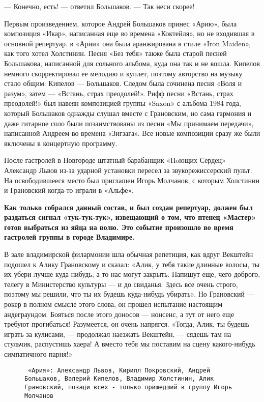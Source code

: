 — Конечно, есть! — ответил Большаков.
— Так неси скорее!

Первым произведением, которое Андрей Большаков принес «Арию», была композиция «Икар», написанная еще во времена
«Коктейля», но не входившая в основной репертуар. в «Арии» она была аранжирована в стиле «Iron Maiden», как того хотел
Холстинин. Песня «Без тебя» также была старой песней Большакова, написанной для сольного альбома, куда она так и не
вошла. Кипелов немного скорректировал ее мелодию и куплет, поэтому авторство на музыку стало общим: Кипелов — Большаков.
Следом была сочинена песня «Воля и разум», затем — «Встань, страх преодолей!». Рифф песни «Встань, страх преодолей!» был
навеян композицией группы «Saxon» с альбома 1984 года, который Большаков однажды слушал вместе с Грановским, но сама
гармония и даже гитарное соло были позаимствованы из песни «Мы принимаем передачи», написанной Андреем во времена
«Зигзага». Все новые композиции сразу же были включены в концертную программу.

После гастролей в Новгороде штатный барабанщик «Пoющих Сердец» Александр Львов из-за ударной установки пересел за
звукорежиссерский пульт. На освободившееся место был приглашен Игорь Молчанов, с которым Холстинин и Грановский когда-то
играли в «Альфе».

\textbf{Как только собрался данный состав, и был создан репертуар, должен был раздаться сигнал «тук-тук-тук», извещающий
о том, что птенец «Мастер» готов выбраться из яйца на волю. Это событие произошло во время гастролей группы в городе
Владимире.}

В зале владимирской филармонии шла обычная репетиция, как вдруг Векштейн подошел к Алику Грановскому и сказал: «Алик, у
тебя такие длинные волосы, ты их убери лучше куда-нибудь, а то нас могут закрыть. Напишут еще, чего доброго, телегу в
Министерство культуры — и до свиданья. Здесь все очень строго, поэтому мы решили, что ты их будешь куда-нибудь убирать».
Но Грановский — рокер в полном смысле этого слова, он прошел испытание настоящим андеграундом. Бояться после этого
доносов — нонсенс, а тут от него еще требуют прогибаться! Разумеется, он очень напрягся. «Тогда, Алик, ты будешь играть
за кулисами, — продолжал наезжать Векштейн, — сядешь там на стульчик, распустишь хаера! А вместо тебя мы поставим на
сцену какого-нибудь симпатичного парня!»

\begin{figure}[h]
    \centering
    \caption{\texttt{
        «Ария»: Александр Львов, Кирилл Покровский, Андрей Большаков, Валерий Кипелов, Владимир Холстинин, Алик
        Грановский, позади всех - только пришедший в группу Игорь Молчанов
    }}
\end{figure}

